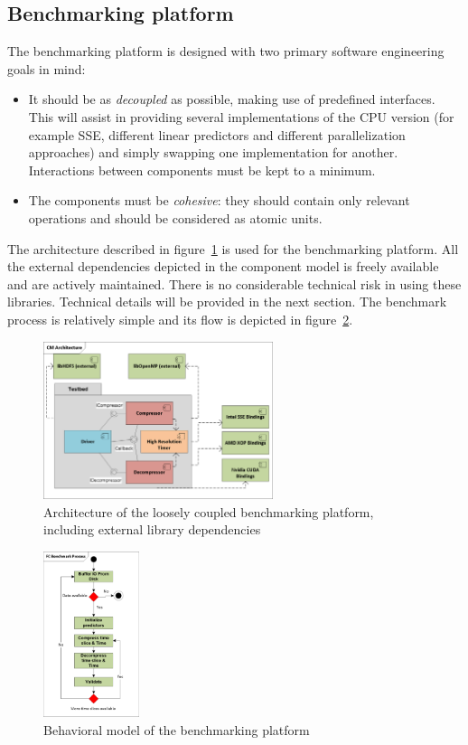 \subsection{Benchmarking platform}
The benchmarking platform is designed with two primary software engineering goals in mind:
\begin{itemize}
 \item It should be as \textit{decoupled} as possible, making use of predefined interfaces. This will assist in providing several implementations of the CPU version (for example SSE, different linear predictors and different parallelization
 approaches) and simply swapping one implementation for another. Interactions between components must be kept to a minimum.
 \item The components must be \textit{cohesive}: they should contain only relevant operations and should be considered as atomic units.
\end{itemize}
The architecture described in figure~\ref{TOOL_ARCH} is used for the benchmarking platform. All the external dependencies depicted in the component model is freely available
and are actively maintained. There is no considerable technical risk in using these libraries. Technical details will be provided in the next section. The 
benchmark process is relatively simple and its flow is depicted in figure~\ref{TOOL_FLOW}.
\begin{figure}[h!]
 \centering
 \includegraphics[width=0.6\textwidth]{Thesis_Arc.png}
 \caption{Architecture of the loosely coupled benchmarking platform, including external library dependencies}
 \label{TOOL_ARCH}
\end{figure}
\begin{figure}[h!]
 \centering
 \includegraphics[width=0.25\textwidth]{Thesis_Flow.png}
 \caption{Behavioral model of the benchmarking platform}
 \label{TOOL_FLOW}
\end{figure}
